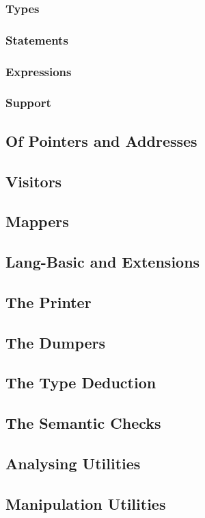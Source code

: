 \subsubsection{Types}
\subsubsection{Statements}
\subsubsection{Expressions}
\subsubsection{Support}

\subsection{Of Pointers and Addresses}
\subsection{Visitors}
\subsection{Mappers}
\subsection{Lang-Basic and Extensions}
\subsection{The Printer}
\subsection{The Dumpers}
\subsection{The Type Deduction}
\subsection{The Semantic Checks}
\subsection{Analysing Utilities}
\subsection{Manipulation Utilities}
